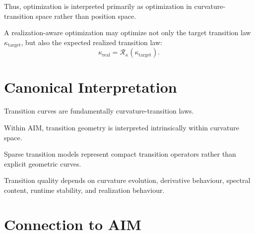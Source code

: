 Thus, optimization is interpreted primarily as optimization in
curvature-transition space rather than position space.

A realization-aware optimization may optimize not only the target
transition law \(\kappa_{\mathrm{target}}\), but also the expected
realized transition law:
\[
\kappa_{\mathrm{real}}
=
\mathcal R_{\kappa}
(
\kappa_{\mathrm{target}}
).
\]

\section{Canonical Interpretation}

\begin{proposition}
Transition curves are fundamentally curvature-transition laws.
\end{proposition}

\begin{proposition}
Within AIM, transition geometry is interpreted intrinsically within
curvature space.
\end{proposition}

\begin{proposition}
Sparse transition models represent compact transition operators rather
than explicit geometric curves.
\end{proposition}

\begin{proposition}
Transition quality depends on curvature evolution, derivative behaviour,
spectral content, runtime stability, and realization behaviour.
\end{proposition}

\section{Connection to AIM}

